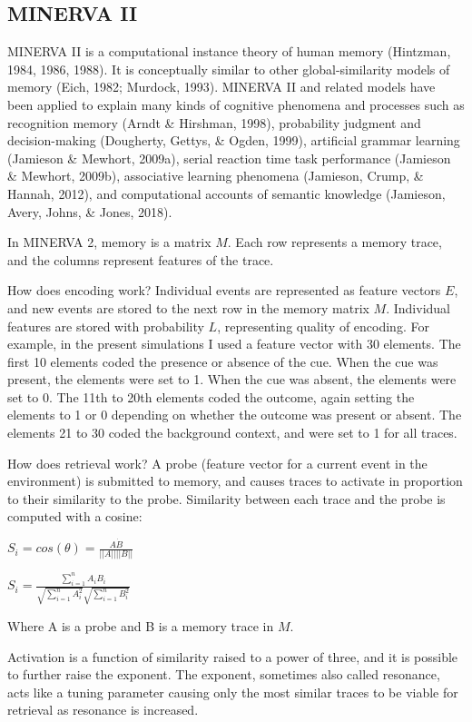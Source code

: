 \documentclass[
  english,
  man,floatsintext]{apa6}
\begin{document}
\hypertarget{minerva-ii}{%
\subsection{MINERVA II}\label{minerva-ii}}

MINERVA II is a computational instance theory of human memory (Hintzman, 1984, 1986, 1988). It is conceptually similar to other global-similarity models of memory (Eich, 1982; Murdock, 1993). MINERVA II and related models have been applied to explain many kinds of cognitive phenomena and processes such as recognition memory (Arndt \& Hirshman, 1998), probability judgment and decision-making (Dougherty, Gettys, \& Ogden, 1999), artificial grammar learning (Jamieson \& Mewhort, 2009a), serial reaction time task performance (Jamieson \& Mewhort, 2009b), associative learning phenomena (Jamieson, Crump, \& Hannah, 2012), and computational accounts of semantic knowledge (Jamieson, Avery, Johns, \& Jones, 2018).

In MINERVA 2, memory is a matrix \(M\). Each row represents a memory trace, and the columns represent features of the trace.

How does encoding work? Individual events are represented as feature vectors \(E\), and new events are stored to the next row in the memory matrix \(M\). Individual features are stored with probability \(L\), representing quality of encoding. For example, in the present simulations I used a feature vector with 30 elements. The first 10 elements coded the presence or absence of the cue. When the cue was present, the elements were set to 1. When the cue was absent, the elements were set to 0. The 11th to 20th elements coded the outcome, again setting the elements to 1 or 0 depending on whether the outcome was present or absent. The elements 21 to 30 coded the background context, and were set to 1 for all traces.

How does retrieval work? A probe (feature vector for a current event in the environment) is submitted to memory, and causes traces to activate in proportion to their similarity to the probe. Similarity between each trace and the probe is computed with a cosine:

\(S_i = cos(\theta) = \frac{A \dot B}{||A|| ||B||}\)

\(S_i = \frac{\sum_{i=1}^n A_iB_i}{\sqrt{\sum_{i=1}^n A_i^2}\sqrt{\sum_{i=1}^n B_i^2}}\)

Where A is a probe and B is a memory trace in \(M\).

Activation is a function of similarity raised to a power of three, and it is possible to further raise the exponent. The exponent, sometimes also called resonance, acts like a tuning parameter causing only the most similar traces to be viable for retrieval as resonance is increased.
\end{document}
